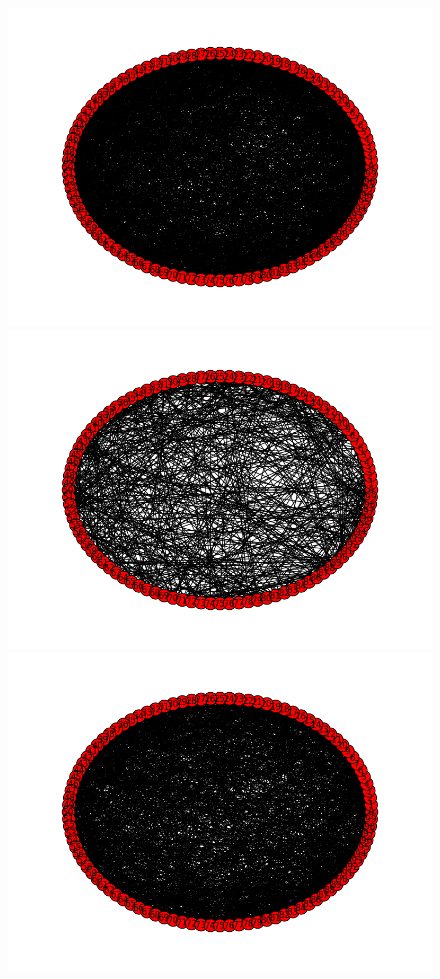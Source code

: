 \begin{figure}[ht!]
\begin{center}
\includegraphics[scale=0.5]{./images/sim1_completedMessage_complete.png}
\includegraphics[scale=0.5]{./images/sim1_completedMessage_tx.png}
\includegraphics[scale=0.5]{./images/sim1_completedMessage_chaff.png}

\end{center}
\end{figure}
